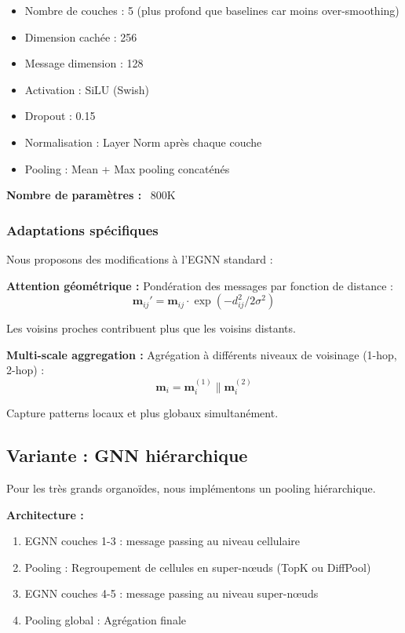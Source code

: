 \begin{itemize}
    \item Nombre de couches : 5 (plus profond que baselines car moins over-smoothing)
    \item Dimension cachée : 256
    \item Message dimension : 128
    \item Activation : SiLU (Swish)
    \item Dropout : 0.15
    \item Normalisation : Layer Norm après chaque couche
    \item Pooling : Mean + Max pooling concaténés
\end{itemize}

\textbf{Nombre de paramètres :} ~800K

\subsubsection{Adaptations spécifiques}

Nous proposons des modifications à l'EGNN standard :

\textbf{Attention géométrique :}
Pondération des messages par fonction de distance :
\[
\mathbf{m}_{ij}' = \mathbf{m}_{ij} \cdot \exp(-d_{ij}^2 / 2\sigma^2)
\]

Les voisins proches contribuent plus que les voisins distants.

\textbf{Multi-scale aggregation :}
Agrégation à différents niveaux de voisinage (1-hop, 2-hop) :
\[
\mathbf{m}_i = \mathbf{m}_i^{(1)} \| \mathbf{m}_i^{(2)}
\]

Capture patterns locaux et plus globaux simultanément.

\subsection{Variante : GNN hiérarchique}

Pour les très grands organoïdes, nous implémentons un pooling hiérarchique.

\textbf{Architecture :}
\begin{enumerate}
    \item EGNN couches 1-3 : message passing au niveau cellulaire
    \item Pooling : Regroupement de cellules en super-nœuds (TopK ou DiffPool)
    \item EGNN couches 4-5 : message passing au niveau super-nœuds
    \item Pooling global : Agrégation finale
\end{enumerate}

